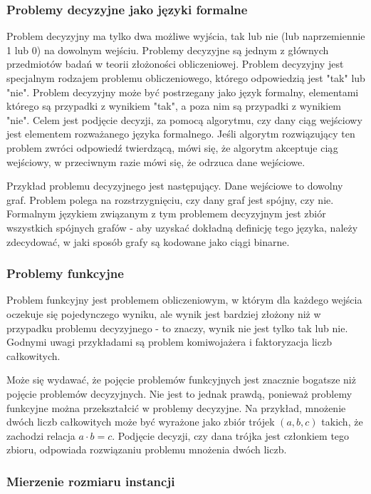 		\subsubsection{Problemy decyzyjne jako języki formalne}

Problem decyzyjny ma tylko dwa możliwe wyjścia, tak lub nie (lub naprzemiennie 1 lub 0) na dowolnym wejściu.
Problemy decyzyjne są jednym z głównych przedmiotów badań w teorii złożoności obliczeniowej. Problem decyzyjny jest specjalnym rodzajem problemu obliczeniowego, którego odpowiedzią jest "tak" lub "nie". Problem decyzyjny może być postrzegany jako język formalny, elementami którego są przypadki z wynikiem "tak", a poza nim są przypadki z wynikiem "nie". Celem jest podjęcie decyzji, za pomocą algorytmu, czy dany ciąg wejściowy jest elementem rozważanego języka formalnego. Jeśli algorytm rozwiązujący ten problem zwróci odpowiedź twierdzącą, mówi się, że algorytm akceptuje ciąg wejściowy, w przeciwnym razie mówi się, że odrzuca dane wejściowe.

Przykład problemu decyzyjnego jest następujący. Dane wejściowe to dowolny graf. Problem polega na rozstrzygnięciu, czy dany graf jest spójny, czy nie. Formalnym językiem związanym z tym problemem decyzyjnym jest zbiór wszystkich spójnych grafów - aby uzyskać dokładną definicję tego języka, należy zdecydować, w jaki sposób grafy są kodowane jako ciągi binarne.

		\subsubsection{Problemy funkcyjne}

Problem funkcyjny jest problemem obliczeniowym, w którym dla każdego wejścia oczekuje się pojedynczego wyniku, ale wynik jest bardziej złożony niż w przypadku problemu decyzyjnego - to znaczy, wynik nie jest tylko tak lub nie. Godnymi uwagi przykładami są problem komiwojażera i faktoryzacja liczb całkowitych.

Może się wydawać, że pojęcie problemów funkcyjnych jest znacznie bogatsze niż pojęcie problemów decyzyjnych. Nie jest to jednak prawdą, ponieważ problemy funkcyjne można przekształcić w problemy decyzyjne. Na przykład, mnożenie dwóch liczb całkowitych może być wyrażone jako zbiór trójek $(a, b, c)$ takich, że zachodzi relacja $a \cdot b = c$. Podjęcie decyzji, czy dana trójka jest członkiem tego zbioru, odpowiada rozwiązaniu problemu mnożenia dwóch liczb.

		\subsubsection{Mierzenie rozmiaru instancji}

